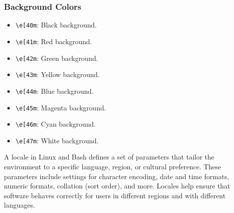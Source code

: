 \documentclass{report}
\begin{document}
    \subsubsection{Background Colors}
    \begin{itemize}
        \item \texttt{\textbackslash e[40m}: Black background.
        \item \texttt{\textbackslash e[41m}: Red background.
        \item \texttt{\textbackslash e[42m}: Green background.
        \item \texttt{\textbackslash e[43m}: Yellow background.
        \item \texttt{\textbackslash e[44m}: Blue background.
        \item \texttt{\textbackslash e[45m}: Magenta background.
        \item \texttt{\textbackslash e[46m}: Cyan background.
        \item \texttt{\textbackslash e[47m}: White background.
    \end{itemize}

    \pagebreak 
    \bigbreak \noindent 
    \begin{concept}
        A locale in Linux and Bash defines a set of parameters that tailor the environment to a specific language, region, or cultural preference. These parameters include settings for character encoding, date and time formats, numeric formats, collation (sort order), and more. Locales help ensure that software behaves correctly for users in different regions and with different languages.
    \end{concept}
    \bigbreak \noindent 
\end{document}
